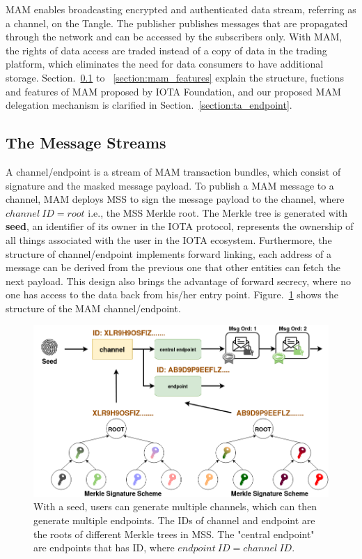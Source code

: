 \begin{spacing}{2.0}
\label{section:MAM}
MAM enables broadcasting encrypted and authenticated data stream, referring as a channel, on the Tangle. The publisher publishes messages that are propagated through the network and can be accessed by the subscribers only. With MAM, the rights of data access are traded instead of a copy of data in the trading platform, which eliminates the need for data consumers to have additional storage.
Section.~\ref{section:mam_streams} to ~\ref{section:mam_features} explain the structure, fuctions and features of MAM proposed by IOTA Foundation, and our proposed MAM delegation mechanism is clarified in Section.~\ref{section:ta_endpoint}.

\subsection{The Message Streams}
\label{section:mam_streams}
A channel/endpoint is a stream of MAM transaction bundles, which consist of signature and the masked message payload. To publish a MAM message to a channel, MAM deploys MSS to sign the message payload to the channel, where $channel\ ID = root$ i.e., the MSS Merkle root. The Merkle tree is generated with \textbf{seed}, an identifier of its owner in the IOTA protocol, represents the ownership of all things associated with the user in the IOTA ecosystem. Furthermore, the structure of channel/endpoint implements forward linking, each address of a message can be derived from the previous one that other entities can fetch the next payload. This design also brings the advantage of forward secrecy, where no one has access to the data back from his/her entry point. Figure.~\ref{fig:mam_structure} shows the structure of the MAM channel/endpoint.

\begin{figure}[h]
    \centering
    \includegraphics[width=5.5in]{img/mam_structure}
    \caption{With a seed, users can generate multiple channels, which can then generate multiple endpoints. The IDs of channel and endpoint are the roots of different Merkle trees in MSS. The "central endpoint" are endpoints that has ID, where $endpoint\ ID = channel\ ID$.}
    \label{fig:mam_structure}
\end{figure}
\clearpage


\end{spacing}
